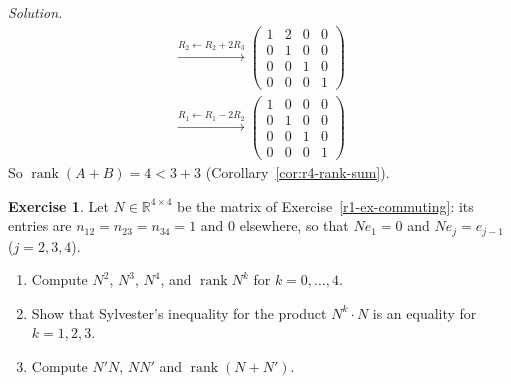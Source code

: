 \documentclass[12pt]{article}
\newcommand{\R}{\mathbb R}
\DeclareMathOperator{\rank}{rank}
\theoremstyle{definition}
\newtheorem{exercise}{Exercise}
\newenvironment{solution}{\par\noindent\textit{Solution.}\ }{\par\smallskip}
\begin{document}
\begin{solution}
\[\begin{gathered}
\xrightarrow{R_2\leftarrow R_2+2R_3}
\begin{pmatrix}1&2&0&0\\0&1&0&0\\0&0&1&0\\0&0&0&1\end{pmatrix}
\\
\xrightarrow{R_1\leftarrow R_1-2R_2}
\begin{pmatrix}1&0&0&0\\0&1&0&0\\0&0&1&0\\0&0&0&1\end{pmatrix}
\end{gathered}
\]
So \(\rank(A+B)=4<3+3\) (Corollary~\ref{cor:r4-rank-sum}).
\end{solution}

\begin{exercise}\label{ex:r4-shift-ranks}
Let \(N\in\R^{4\times4}\) be the matrix of Exercise~\ref{r1-ex-commuting}: its entries are \(n_{12}=n_{23}=n_{34}=1\)
and \(0\) elsewhere, so that \(Ne_1=0\) and \(Ne_j=e_{j-1}\) (\(j=2,3,4\)).
\begin{enumerate}
\item Compute \(N^2\), \(N^3\), \(N^4\), and \(\rank N^k\) for \(k=0,\dots,4\).
\item Show that Sylvester's inequality for the product \(N^k\cdot N\) is an equality for
\(k=1,2,3\).
\item Compute \(N'N\), \(NN'\) and \(\rank(N+N')\).
\end{enumerate}
\end{exercise}
\end{document}
